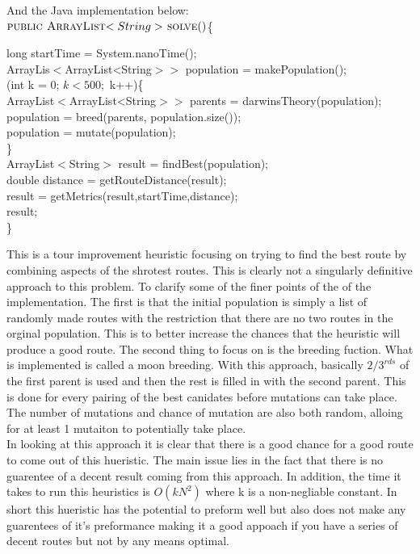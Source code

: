 \documentclass[midd]{thesis}
\newcommand{\tab}{\hspace*{2em}}
\begin{document}
And the Java implementation below:\\
$\textnormal{\scshape public ArrayList$<String>$ solve}()$\{
\begin{codebox}
long startTime = System.nanoTime();\\
\tab ArrayLis$<$ArrayList<String$>>$ population =  makePopulation();\\
\tab\For(int k = 0; $k < 500;$ k++)\{\\
\tab\tab ArrayList$<$ArrayList<String$>>$ parents = darwinsTheory(population);\\
\tab\tab population = breed(parents, population.size());\\
\tab\tab population =  mutate(population);\End\\
\tab\}\\
\tab ArrayList$<$String$>$ result = findBest(population);\\
\tab double distance = getRouteDistance(result);\\
\tab result = getMetrics(result,startTime,distance);\\
\Return result;\\
\}\\
\end{codebox}
\tab This is a tour improvement heuristic focusing on trying to find the best route by combining aspects of the shrotest routes. This is clearly not a singularly definitive approach to this problem. To clarify some of the finer points of the of the implementation. The first is that the initial population is simply a list of randomly made routes with the restriction that there are no two routes in the orginal population. This is to better increase the chances that the heuristic will produce a good route. The second thing to focus on is the breeding fuction. What is implemented is called a moon breeding. With this approach, basically $2/3^{rds}$ of the first parent is used and then the rest is filled in with the second parent. This is done for every pairing of the best canidates before mutations can take place. The number of mutations and chance of mutation are also both random, alloing for at least 1 mutaiton to potentially take place.\\
\tab In looking at this approach it is clear that there is a good chance for a good route to come out of this hueristic. The main issue lies in the fact that there is no guarentee of a decent result coming from this approach. In addition, the time it takes to run this heuristics is $O(kN^2)$ where k is a non-negliable constant. In short this hueristic has the potential to preform well but also does not make any guarentees of it's preformance making it a good appoach if you have a series of decent routes but not by any means optimal.
\end{document}

